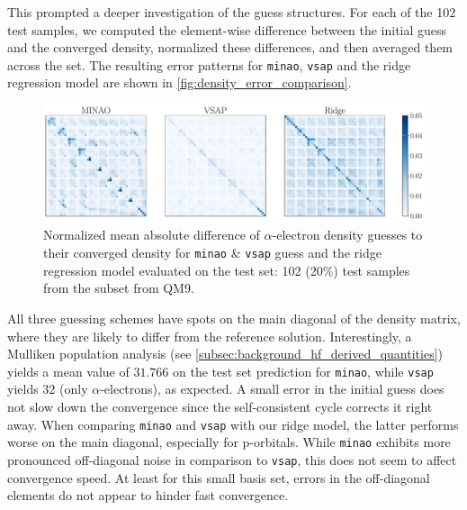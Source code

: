 This prompted a deeper investigation of the guess structures. For each of the 102 test samples, we computed the element-wise difference between the initial guess and the converged density, normalized these differences, and then averaged them across the set. The resulting error patterns for \texttt{minao}, \texttt{vsap} and the ridge regression model are shown in \autoref{fig:density_error_comparison}.
\begin{figure}[H]
    \centering
    \includegraphics[width=\textwidth]{../fig/c5h4n2o2/density_error_comparison.pdf}
    \caption[Normalized difference of density guesses]{Normalized mean absolute difference of $\alpha$-electron density guesses to their converged density for \texttt{minao} \& \texttt{vsap} guess and the ridge regression model evaluated on the test set: 102 (20\%) test samples from the  subset from QM9. \parencite{ref:article1_qm9}}
    \label{fig:density_error_comparison}
\end{figure}
All three guessing schemes have spots on the main diagonal of the density matrix, where they are likely to differ from the reference solution. Interestingly, a Mulliken population analysis (see \autoref{subsec:background_hf_derived_quantities}) \parencite{ref:Mulliken_population_analysis} yields a mean value of $31.766$ on the test set prediction for \texttt{minao}, while \texttt{vsap} yields $32$ (only $\alpha$-electrons), as expected. A small error in the initial guess does not slow down the convergence since the self-consistent cycle corrects it right away. When comparing \texttt{minao} and \texttt{vsap} with our ridge model, the latter performs worse on the main diagonal, especially for p-orbitals. While \texttt{minao} exhibits more pronounced off-diagonal noise in comparison to \texttt{vsap}, this does not seem to affect convergence speed. At least for this small basis set, errors in the off-diagonal elements do not appear to hinder fast convergence. %

